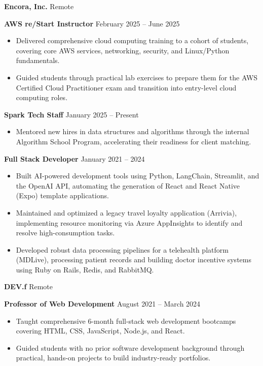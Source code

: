 \documentclass[11pt]{article}
\begin{document}
\textbf{Encora, Inc.} \hfill Remote

\textbf{AWS re/Start Instructor} \hfill February 2025 – June 2025
\begin{itemize}[noitemsep, topsep=0pt, partopsep=0pt, parsep=0pt]
    \item Delivered comprehensive cloud computing training to a cohort of students, covering core AWS services, networking, security, and Linux/Python fundamentals.
    \item Guided students through practical lab exercises to prepare them for the AWS Certified Cloud Practitioner exam and transition into entry-level cloud computing roles.
\end{itemize}

\vspace{8pt}

\textbf{Spark Tech Staff} \hfill January 2025 – Present
\begin{itemize}[noitemsep, topsep=0pt, partopsep=0pt, parsep=0pt]
    \item Mentored new hires in data structures and algorithms through the internal Algorithm School Program, accelerating their readiness for client matching.
\end{itemize}

\vspace{8pt}

\textbf{Full Stack Developer} \hfill January 2021 – 2024
\begin{itemize}[noitemsep, topsep=0pt, partopsep=0pt, parsep=0pt]
    \item Built AI-powered development tools using Python, LangChain, Streamlit, and the OpenAI API, automating the generation of React and React Native (Expo) template applications.
    \item Maintained and optimized a legacy travel loyalty application (Arrivia), implementing resource monitoring via Azure AppInsights to identify and resolve high-consumption tasks.
    \item Developed robust data processing pipelines for a telehealth platform (MDLive), processing patient records and building doctor incentive systems using Ruby on Rails, Redis, and RabbitMQ.
\end{itemize}

\vspace{8pt}

\textbf{DEV.f} \hfill Remote

\textbf{Professor of Web Development} \hfill August 2021 – March 2024
\begin{itemize}[noitemsep, topsep=0pt, partopsep=0pt, parsep=0pt]
    \item Taught comprehensive 6-month full-stack web development bootcamps covering HTML, CSS, JavaScript, Node.js, and React.
    \item Guided students with no prior software development background through practical, hands-on projects to build industry-ready portfolios.
\end{itemize}
\end{document}
